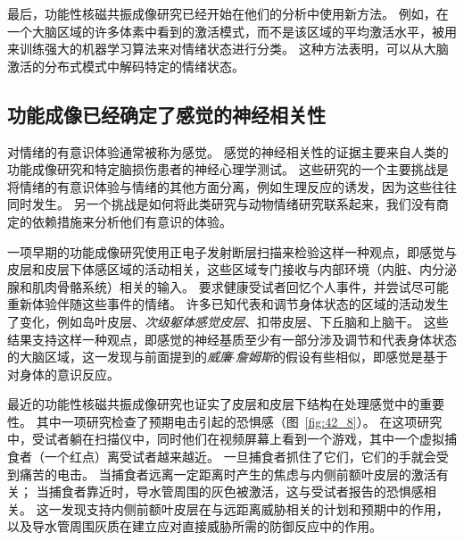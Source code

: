 最后，功能性核磁共振成像研究已经开始在他们的分析中使用新方法。
例如，在一个大脑区域的许多体素中看到的激活模式，而不是该区域的平均激活水平，被用来训练强大的机器学习算法来对情绪状态进行分类。
这种方法表明，可以从大脑激活的分布式模式中解码特定的情绪状态。



\subsection{功能成像已经确定了感觉的神经相关性}

对情绪的有意识体验通常被称为感觉。
感觉的神经相关性的证据主要来自人类的功能成像研究和特定脑损伤患者的神经心理学测试。
这些研究的一个主要挑战是将情绪的有意识体验与情绪的其他方面分离，例如生理反应的诱发，因为这些往往同时发生。
另一个挑战是如何将此类研究与动物情绪研究联系起来，我们没有商定的依赖措施来分析他们有意识的体验。


一项早期的功能成像研究使用正电子发射断层扫描来检验这样一种观点，即感觉与皮层和皮层下体感区域的活动相关，这些区域专门接收与内部环境（内脏、内分泌腺和肌肉骨骼系统）相关的输入。
要求健康受试者回忆个人事件，并尝试尽可能重新体验伴随这些事件的情绪。
许多已知代表和调节身体状态的区域的活动发生了变化，例如岛叶皮层、\textit{次级躯体感觉皮层}、扣带皮层、下丘脑和上脑干。
这些结果支持这样一种观点，即感觉的神经基质至少有一部分涉及调节和代表身体状态的大脑区域，这一发现与前面提到的\textit{威廉$\cdot$詹姆斯}的假设有些相似，即感觉是基于对身体的意识反应。


最近的功能性核磁共振成像研究也证实了皮层和皮层下结构在处理感觉中的重要性。
其中一项研究检查了预期电击引起的恐惧感（图~\ref{fig:42_8}）。
在这项研究中，受试者躺在扫描仪中，同时他们在视频屏幕上看到一个游戏，其中一个虚拟捕食者（一个红点）离受试者越来越近。
一旦捕食者抓住了它们，它们的手就会受到痛苦的电击。
当捕食者远离一定距离时产生的焦虑与内侧前额叶皮层的激活有关；
当捕食者靠近时，导水管周围的灰色被激活，这与受试者报告的恐惧感相关。
这一发现支持内侧前额叶皮层在与远距离威胁相关的计划和预期中的作用，以及导水管周围灰质在建立应对直接威胁所需的防御反应中的作用。


